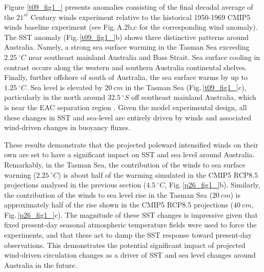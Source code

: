 \documentclass[draft,linenumbers]{agujournal2018}
\begin{document}
Figure \ref{t09_fig1_} presents anomalies consisting of the final decadal average of the $21^{st}$ Century winds experiment relative to the historical 1950-1969 CMIP5 winds baseline experiment (see Fig.\,A.2b,c for the corresponding wind anomaly). The SST anomaly (Fig.\,\ref{t09_fig1_}b) shows three distinctive patterns around Australia. Namely, a strong sea surface warming in the Tasman Sea exceeding $2.25\ ^{\circ}C$ near southeast mainland Australia and Bass Strait. Sea surface cooling in contrast occurs along the western and southern Australia continental shelves. Finally, further offshore of south of Australia, the sea surface warms by up to $1.25\ ^{\circ}C$. Sea level is elevated by $20\ cm$ in the Tasman Sea (Fig.\,\ref{t09_fig1_}c), particularly in the north around $32.5\ ^{\circ}S$ off southeast mainland Australia, which is near the EAC separation region \citep{Godfrey1980}. Given the model experimental design, all these changes in SST and sea-level are entirely driven by winds and associated wind-driven changes in buoyancy fluxes.

These results demonstrate that the projected poleward intensified winds on their own are set to have a significant impact on SST and sea level around Australia. Remarkably, in the Tasman Sea, the contribution of the winds to sea surface warming ($2.25\ ^{\circ}C$) is about half of the warming simulated in the CMIP5 RCP8.5 projections analysed in the previous section ($4.5\ ^{\circ}C$, Fig.\,\ref{p26_fig1_}b). Similarly, the contribution of the winds to sea level rise in the Tasman Sea ($20\ cm$) is approximately half of the rise shown in the CMIP5 RCP8.5 projections ($40\ cm$, Fig.\,\ref{p26_fig1_}c). The magnitude of these SST changes is impressive given that fixed present-day seasonal atmospheric temperature fields were used to force the experiments, and that these act to damp the SST response toward present-day observations. This demonstrates the potential significant impact of projected wind-driven circulation changes as a driver of SST and sea level changes around Australia in the future.
\end{document}
